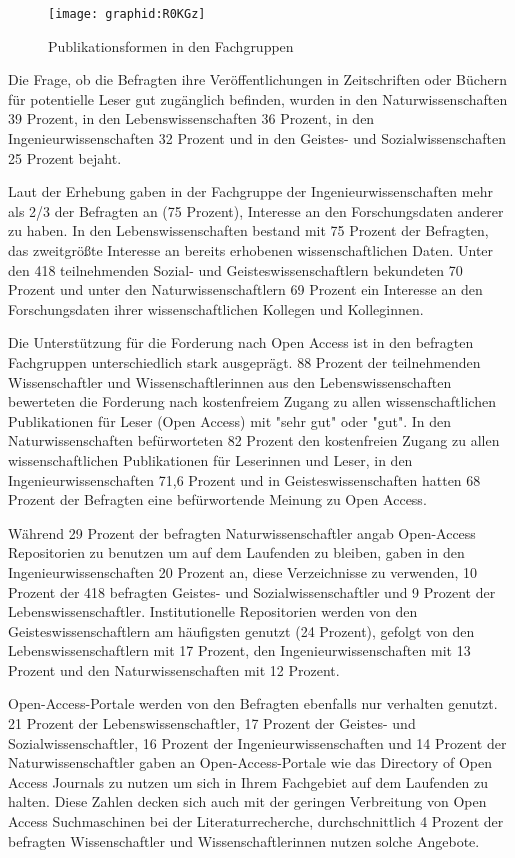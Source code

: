  \begin{figure}[h!]
 \texttt{[image: graphid:R0KGz]}
 \caption{Publikationsformen in den Fachgruppen}
 \end{figure}

Die Frage, ob die Befragten ihre Veröffentlichungen in Zeitschriften oder Büchern für potentielle Leser gut zugänglich befinden, wurden in den Naturwissenschaften 39 Prozent, in den Lebenswissenschaften 36 Prozent, in den Ingenieurwissenschaften 32 Prozent und in den Geistes- und Sozialwissenschaften 25 Prozent bejaht.

Laut der Erhebung gaben in der Fachgruppe der Ingenieurwissenschaften mehr als 2/3 der Befragten an (75 Prozent), Interesse an den Forschungsdaten anderer zu haben. In den Lebenswissenschaften bestand mit 75 Prozent der Befragten, das zweitgrößte Interesse an bereits erhobenen wissenschaftlichen Daten. Unter den 418 teilnehmenden Sozial- und Geisteswissenschaftlern bekundeten 70 Prozent und unter den Naturwissenschaftlern 69 Prozent ein Interesse an den Forschungsdaten ihrer wissenschaftlichen Kollegen und Kolleginnen.

Die Unterstützung für die Forderung nach Open Access ist in den befragten Fachgruppen unterschiedlich stark ausgeprägt. 88 Prozent der teilnehmenden Wissenschaftler und Wissenschaftlerinnen aus den Lebenswissenschaften bewerteten die Forderung nach kostenfreiem Zugang zu allen wissenschaftlichen Publikationen für Leser (Open Access) mit "sehr gut" oder "gut". In den Naturwissenschaften befürworteten 82 Prozent den kostenfreien Zugang zu allen wissenschaftlichen Publikationen für Leserinnen und Leser, in den Ingenieurwissenschaften 71,6 Prozent und in Geisteswissenschaften hatten 68 Prozent der Befragten eine befürwortende Meinung zu Open Access.

Während 29 Prozent der befragten Naturwissenschaftler angab Open-Access Repositorien zu benutzen um auf dem Laufenden zu bleiben, gaben in den Ingenieurwissenschaften 20 Prozent an, diese Verzeichnisse zu verwenden, 10 Prozent der 418 befragten Geistes- und Sozialwissenschaftler und 9 Prozent der Lebenswissenschaftler. Institutionelle Repositorien werden von den Geisteswissenschaftlern am häufigsten genutzt (24 Prozent), gefolgt von den Lebenswissenschaftlern mit 17 Prozent, den Ingenieurwissenschaften  mit 13 Prozent und den Naturwissenschaften mit 12 Prozent.

Open-Access-Portale werden von den Befragten ebenfalls nur verhalten genutzt. 21 Prozent der Lebenswissenschaftler, 17 Prozent der Geistes- und Sozialwissenschaftler, 16 Prozent der Ingenieurwissenschaften und 14 Prozent der Naturwissenschaftler gaben an Open-Access-Portale wie das Directory of Open Access Journals zu nutzen um sich in Ihrem Fachgebiet auf dem Laufenden zu halten. Diese Zahlen decken sich auch mit der geringen Verbreitung von Open Access Suchmaschinen bei der Literaturrecherche, durchschnittlich 4 Prozent der befragten Wissenschaftler und Wissenschaftlerinnen nutzen solche Angebote.

